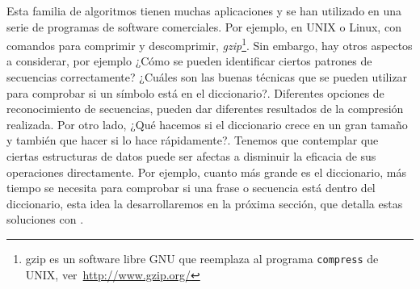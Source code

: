 Esta familia de algoritmos tienen muchas aplicaciones y se han utilizado en una serie de programas de software comerciales. Por ejemplo, en UNIX o Linux, con comandos para comprimir y descomprimir, \emph{gzip}\footnote{gzip es un software libre GNU que reemplaza al programa \texttt{compress} de UNIX, ver~\url{http://www.gzip.org/}}. Sin embargo, hay otros aspectos a considerar, por ejemplo ¿Cómo se pueden identificar ciertos patrones de secuencias correctamente? ¿Cuáles son las buenas técnicas que se pueden utilizar para comprobar si un símbolo está en el diccionario?. Diferentes opciones de reconocimiento de secuencias, pueden dar diferentes resultados de la compresión realizada. Por otro lado, ¿Qué hacemos si el diccionario crece en un gran tamaño y también que hacer si lo hace rápidamente?. Tenemos que contemplar que ciertas estructuras de datos puede ser afectas a disminuir la eficacia de sus operaciones directamente. Por ejemplo, cuanto más grande es el diccionario, más tiempo se necesita para comprobar si una frase o secuencia está dentro del diccionario, esta idea la desarrollaremos en la próxima sección, que detalla estas soluciones con \lzSieteOcho. 





 
% 

 




